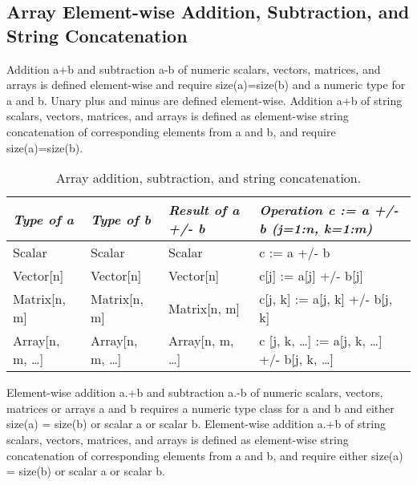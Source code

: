 \subsection{Array Element-wise Addition, Subtraction, and String Concatenation}

Addition a+b and subtraction a-b of numeric scalars, vectors, matrices,
and arrays is defined element-wise and require size(a)=size(b) and a
numeric type for a and b. Unary plus and minus are defined element-wise.
Addition a+b of string scalars, vectors, matrices, and arrays is defined
as element-wise string concatenation of corresponding elements from a
and b, and require size(a)=size(b).

\begin{longtable}[]{|l|l|l|l|}
\caption{Array addition, subtraction, and string concatenation.}\\
\hline
\emph{Type of a} & \emph{Type of b} & \emph{Result of a +/- b} &
\emph{Operation c := a +/- b (j=1:n, k=1:m)}\\ \hline
\endhead
Scalar & Scalar & Scalar & c := a +/- b\\ \hline
Vector{[}n{]} & Vector{[}n{]} & Vector{[}n{]} & c{[}j{]} := a{[}j{]} +/-
b{[}j{]}\\ \hline
Matrix{[}n, m{]} & Matrix{[}n, m{]} & Matrix{[}n, m{]} & c{[}j, k{]} :=
a{[}j, k{]} +/- b{[}j, k{]}\\ \hline
Array{[}n, m, \ldots{}{]} & Array{[}n, m, \ldots{}{]} & Array{[}n, m,
\ldots{}{]} & c {[}j, k, \ldots{}{]} := a{[}j, k, \ldots{}{]} +/- b{[}j,
k, \ldots{}{]}\\ \hline
\end{longtable}

Element-wise addition a.+b and subtraction a.-b of numeric scalars,
vectors, matrices or arrays a and b requires a numeric type class for a
and b and either size(a) = size(b) or scalar a or scalar b. Element-wise
addition a.+b of string scalars, vectors, matrices, and arrays is
defined as element-wise string concatenation of corresponding elements
from a and b, and require either size(a) = size(b) or scalar a or scalar
b.

